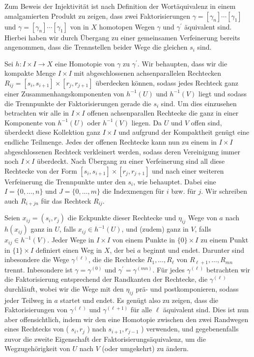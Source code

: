 \documentclass[10pt, letterpaper]{article}
\begin{document}
Zum Beweis der Injektivität ist nach Definition der Wortäquivalenz in einem amalgamierten Produkt zu zeigen, dass zwei Faktorisierungen $\gamma=\left[\gamma_{n}\right] \cdots\left[\gamma_{1}\right]$ und $\gamma=\left[\gamma_{n}\right] \cdots\left[\gamma_{1}\right]$ von in $X$ homotopen Wegen $\gamma$ und $\gamma^{\prime}$ äquivalent sind. Hierbei haben wir durch Übergang zu einer gemeinsamen Verfeinerung bereits angenommen, dass die Trennstellen beider Wege die gleichen $s_{i}$ sind.

Sei $h: I \times I \rightarrow X$ eine Homotopie von $\gamma$ zu $\gamma^{\prime}$. Wir behaupten, dass wir die kompakte Menge $I \times I$ mit abgeschlossenen achsenparallelen Rechtecken $R_{i j}=\left[s_{i}, s_{i+1}\right] \times\left[r_{j}, r_{j+1}\right]$ überdecken können, sodass jedes Rechteck ganz einer Zusammenhangskomponenten von $h^{-1}(U)$ und $h^{-1}(V)$ liegt und sodass die Trennpunkte der Faktorisierungen gerade die $s_{i}$ sind. Um dies einzusehen betrachten wir alle in $I \times I$ offenen achsenparallen Rechtecke die ganz in einer Komponente von $h^{-1}(U)$ oder $h^{-1}(V)$ liegen. Da $U$ und $V$ offen sind, überdeckt diese Kollektion ganz $I \times I$ und aufgrund der Kompaktheit genügt eine endliche Teilmenge. Jedes der offenen Rechtecke kann nun zu einem in $I \times I$ abgeschlossenen Rechteck verkleinert werden, sodass deren Vereinigung immer noch $I \times I$ überdeckt. Nach Übergang zu einer Verfeinerung sind all diese Rechtecke von der Form $\left[s_{i}, s_{i+1}\right] \times\left[r_{j}, r_{j+1}\right]$ und nach einer weiteren Verfeinerung die Trennpunkte unter den $s_{i}$, wie behauptet. Dabei eine $I=\{0, \ldots, n\}$ und $J=\{0, \ldots, m\}$ die Indexmengen für $i$ bzw. für $j$. Wir schreiben auch $R_{i+j n}$ für das Rechteck $R_{i j}$.

Seien $x_{i j}=\left(s_{i}, r_{j}\right)$ die Eckpunkte dieser Rechtecke und $\eta_{i j}$ Wege von $a$ nach $h\left(x_{i j}\right)$ ganz in $U$, falls $x_{i j} \in h^{-1}(U)$, und (zudem) ganz in $V$, falls $x_{i j} \in h^{-1}(V)$. Jeder Wege in $I \times I$ von einem Punkte in $\{0\} \times I$ zu einem Punkt in $\{1\} \times I$ definiert einen Weg in $X$, der bei $a$ beginnt und endet. Darunter sind inbesondere die Wege $\gamma^{(\ell)}$, die die Rechtecke $R_{1}, \ldots, R_{\ell}$ von $R_{\ell+1}, \ldots, R_{m n}$ trennt. Inbesondere ist $\gamma=\gamma^{(0)}$ und $\gamma^{\prime}=\gamma^{(m n)}$. Für jedes $\gamma^{(\ell)}$ betrachten wir die Faktorisierung entsprechend der Randkanten der Rechtecke, die $\gamma^{(\ell)}$ durchläuft, wobei wir die Wege mit den $\eta_{i j}$ prä- und postkomponieren, sodass jeder Teilweg in $a$ startet und endet. Es genügt also zu zeigen, dass die Faktorisierungen von $\gamma^{(\ell)}$ und $\gamma^{(\ell+1)}$ für alle $\ell$ äquivalent sind. Dies ist nun aber offensichtlich, indem wir den eine Homotopie zwischen den zwei Randwegen eines Rechtecks von ( $s_{i}, r_{j}$ ) nach $s_{i+1}, r_{j-1}$ ) verwenden, und gegebenenfalls zuvor die zweite Eigenschaft der Faktorisierungsäquivalenz, um die Wegzugehörigkeit von $U$ nach $V$ (oder umgekehrt) zu ändern.
\end{document}

